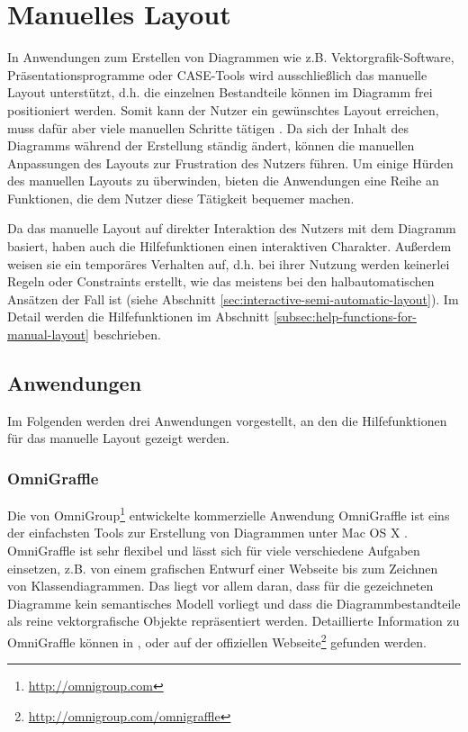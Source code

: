 
\section{Manuelles Layout}
\label{sec:manual-layout}

In Anwendungen zum Erstellen von Diagrammen wie z.B. Vektorgrafik-Software, Präsentationsprogramme oder CASE-Tools wird ausschließlich das manuelle Layout unterstützt, d.h. die einzelnen Bestandteile können im Diagramm frei positioniert werden. Somit kann der Nutzer ein gewünschtes Layout erreichen, muss dafür aber viele manuellen Schritte tätigen \cite{Eichelberger05Aesthetics}. Da sich der Inhalt des Diagramms während der Erstellung ständig ändert, können die manuellen Anpassungen des Layouts zur Frustration des Nutzers führen. Um einige Hürden des manuellen Layouts zu überwinden, bieten die Anwendungen eine Reihe an Funktionen, die dem Nutzer diese Tätigkeit bequemer machen.

Da das manuelle Layout auf direkter Interaktion des Nutzers mit dem Diagramm basiert, haben auch die Hilfefunktionen einen interaktiven Charakter. Außerdem weisen sie ein temporäres Verhalten auf, d.h. bei ihrer Nutzung werden keinerlei Regeln oder Constraints erstellt, wie das meistens bei den halbautomatischen Ansätzen der Fall ist (siehe Abschnitt \ref{sec:interactive-semi-automatic-layout}). Im Detail werden die Hilfefunktionen im Abschnitt \ref{subsec:help-functions-for-manual-layout} beschrieben.

\subsection{Anwendungen}
\label{subsec:applications-for-manual-layout}

Im Folgenden werden drei Anwendungen vorgestellt, an den die Hilfefunktionen für das manuelle Layout gezeigt werden.

\subsubsection{OmniGraffle}
\label{subsubsec:omnigraffle}

Die von OmniGroup\footnote{\url{http://omnigroup.com}} entwickelte kommerzielle Anwendung OmniGraffle ist eins der einfachsten Tools zur Erstellung von Diagrammen unter Mac OS X \cite{Olsen10OmniGraffle}. OmniGraffle ist sehr flexibel und lässt sich für viele verschiedene Aufgaben einsetzen, z.B. von einem grafischen Entwurf einer Webseite bis zum Zeichnen von Klassendiagrammen. Das liegt vor allem daran, dass für die gezeichneten Diagramme kein semantisches Modell vorliegt und dass die Diagrammbestandteile als reine vektorgrafische Objekte repräsentiert werden. Detaillierte Information zu OmniGraffle können in \cite{08OmniGraffle}, \cite{Olsen10OmniGraffle} oder auf der offiziellen Webseite\footnote{\url{http://omnigroup.com/omnigraffle}} gefunden werden.

